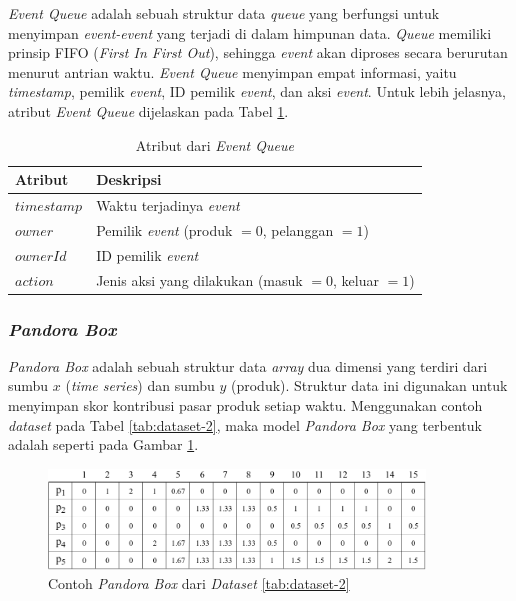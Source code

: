 \textit{Event Queue} adalah sebuah struktur data \textit{queue} yang berfungsi untuk menyimpan \textit{event-event} yang terjadi di dalam himpunan data. \textit{Queue} memiliki prinsip FIFO (\textit{First In First Out}), sehingga \textit{event} akan diproses secara berurutan menurut antrian waktu. \textit{Event Queue} menyimpan empat informasi, yaitu \textit{timestamp}, pemilik \textit{event}, ID pemilik \textit{event}, dan aksi \textit{event}. Untuk lebih jelasnya, atribut \textit{Event Queue} dijelaskan pada Tabel \ref{tab:attr-event-queue}.


\begin{table}[H]
	\centering
	\begin{tabular}{|p{2cm}|p{6cm}|}
		\hline
		\textbf{Atribut} & \textbf{Deskripsi} \\ \hline \hline
		$timestamp$ & Waktu terjadinya \textit{event} \\ \hline
		$owner$ & Pemilik \textit{event} (produk $= 0$, pelanggan $= 1$) \\ \hline
		$ownerId$ & ID pemilik \textit{event}\\ \hline
		$action$ & Jenis aksi yang dilakukan (masuk $= 0$, keluar $= 1$) \\ \hline
	\end{tabular} 
	\caption{Atribut dari \textit{Event Queue}}
	\label{tab:attr-event-queue}
\end{table}

\subsubsection{\textit{Pandora Box}}
\tab \textit{Pandora Box} adalah sebuah struktur data \textit{array} dua dimensi yang terdiri dari sumbu $x$ (\textit{time series}) dan sumbu $y$ (produk). Struktur data ini digunakan untuk menyimpan skor kontribusi pasar produk setiap waktu. Menggunakan contoh \textit{dataset} pada Tabel \ref{tab:dataset-2}, maka model \textit{Pandora Box} yang terbentuk adalah seperti pada Gambar \ref{fig:pbox}.  

\begin{figure}[h]
	\centering
	\includegraphics[width=10cm]{assets/img/bab3/pbox.png}
	\caption{Contoh \textit{Pandora Box} dari \textit{Dataset} \ref{tab:dataset-2}}
	\label{fig:pbox}
\end{figure}

